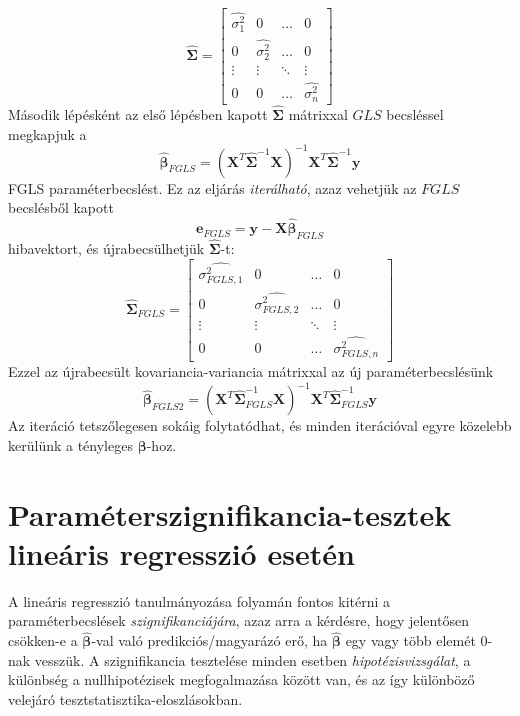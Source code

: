 \documentclass[14p]{report}
\def\pmb{\boldsymbol}
\def\ebeta{\hat{\pmb{\beta}}}
\newcounter{x}
\newcounter{y}
\newcounter{z}
\begin{document}
	\[
		\widehat{\pmb{\Sigma}} = 
		\begin{bmatrix}
			\widehat{\sigma_1^2} & 0 & \dots & 0 \\
			0 & \widehat{\sigma_2^2} & \dots & 0 \\
			\vdots & \vdots & \ddots & \vdots \\
			0 & 0 & \dots & \widehat{\sigma_n^2}
		\end{bmatrix}
	\]
	Második lépésként az első lépésben kapott $\widehat{\pmb{\Sigma}}$ mátrixxal $GLS$ becsléssel megkapjuk a
	\[
		\ebeta_{FGLS} = (\pmb{X}^T\widehat{\pmb{\Sigma}}^{-1}\pmb{X})^{-1}\pmb{X}^T\widehat{\pmb{\Sigma}}^{-1}\pmb{y}
	\]
	FGLS paraméterbecslést. Ez az eljárás \emph{iterálható}, azaz vehetjük az $FGLS$ becslésből kapott
	\[
		\pmb{e}_{FGLS} = \pmb{y} - \pmb{X}\ebeta_{FGLS}
	\]
	hibavektort, és újrabecsülhetjük $\widehat{\pmb{\Sigma}}$-t:
	\[
		\widehat{\pmb{\Sigma}}_{FGLS} =
		\begin{bmatrix}
			\widehat{\sigma_{FGLS,1}^2} & 0 & \dots & 0 \\
			0 & \widehat{\sigma_{FGLS,2}^2} & \dots & 0 \\
			\vdots & \vdots & \ddots & \vdots \\
			0 & 0 & \dots & \widehat{\sigma_{FGLS,n}^2}
		\end{bmatrix}
	\]
	Ezzel az újrabecsült kovariancia-variancia mátrixxal az új paraméterbecslésünk
	\[
		\ebeta_{FGLS2} = (\pmb{X}^T\widehat{\pmb{\Sigma}}_{FGLS}^{-1}\pmb{X})^{-1}\pmb{X}^T\widehat{\pmb{\Sigma}}_{FGLS}^{-1}\pmb{y}
	\]
	Az iteráció tetszőlegesen sokáig folytatódhat, és minden iterációval egyre közelebb kerülünk a tényleges $\pmb{\beta}$-hoz.
	
	\chapter{Paraméterszignifikancia-tesztek lineáris regresszió esetén}
	A lineáris regresszió tanulmányozása folyamán fontos kitérni a paraméterbecslések \emph{szignifikanciájára}, azaz arra a kérdésre, hogy jelentősen csökken-e a $\ebeta$-val való predikciós/magyarázó erő, ha $\ebeta$ egy vagy több elemét $0$-nak vesszük. A szignifikancia tesztelése minden esetben \emph{hipotézisvizsgálat}, a különbség a nullhipotézisek megfogalmazása között van, és az így különböző velejáró tesztstatisztika-eloszlásokban. 
	
\end{document}
